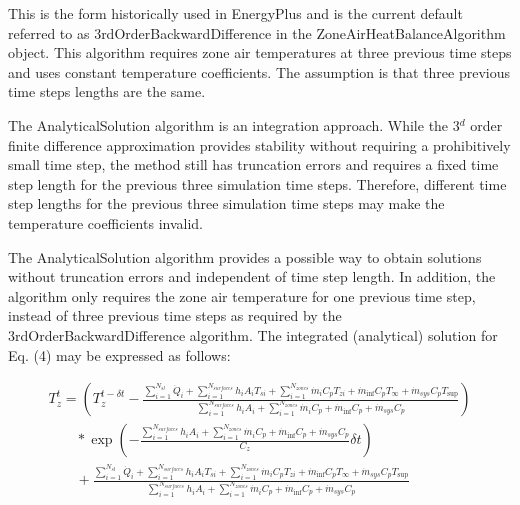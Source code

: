 This is the form historically used in EnergyPlus and is the current default referred to as 3rdOrderBackwardDifference in the ZoneAirHeatBalanceAlgorithm object. This algorithm requires zone air temperatures at three previous time steps and uses constant temperature coefficients. The assumption is that three previous time steps lengths are the same.

The AnalyticalSolution algorithm is an integration approach. While the 3\(^{d}\) order finite difference approximation provides stability without requiring a prohibitively small time step, the method still has truncation errors and requires a fixed time step length for the previous three simulation time steps. Therefore, different time step lengths for the previous three simulation time steps may make the temperature coefficients invalid.

The AnalyticalSolution algorithm provides a possible way to obtain solutions without truncation errors and independent of time step length. In addition, the algorithm only requires the zone air temperature for one previous time step, instead of three previous time steps as required by the 3rdOrderBackwardDifference algorithm. The integrated (analytical) solution for Eq. (4) may be expressed as follows:

\begin{equation}
\begin{array}{l}T_z^t = \left( {T_z^{t - \delta t} - \frac{{\sum\limits_{i = 1}^{{N_{sl}}} {{{\dot Q}_i}}  + \sum\limits_{i = 1}^{{N_{surfaces}}} {{h_i}} {A_i}{T_{si}} + \sum\limits_{i = 1}^{{N_{zones}}} {{{\dot m}_i}} {C_p}{T_{zi}} + {{\dot m}_{\inf }}{C_p}{T_\infty } + {{\dot m}_{sys}}{C_p}{T_{\sup }}}}{{\sum\limits_{i = 1}^{{N_{surfaces}}} {{h_i}} {A_i} + \sum\limits_{i = 1}^{{N_{zones}}} {{{\dot m}_i}} {C_p} + {{\dot m}_{\inf }}{C_p} + {{\dot m}_{sys}}{C_p}}}} \right)\\\;\;\;\;\;\;\;*\exp \left( { - \frac{{\sum\limits_{i = 1}^{{N_{surfaces}}} {{h_i}} {A_i} + \sum\limits_{i = 1}^{{N_{zones}}} {{{\dot m}_i}} {C_p} + {{\dot m}_{\inf }}{C_p} + {{\dot m}_{sys}}{C_p}}}{{{C_z}}}\delta t} \right)\\\;\;\;\;\;\;\; + \frac{{\sum\limits_{i = 1}^{{N_{sl}}} {{{\dot Q}_i}}  + \sum\limits_{i = 1}^{{N_{surfaces}}} {{h_i}} {A_i}{T_{si}} + \sum\limits_{i = 1}^{{N_{zones}}} {{{\dot m}_i}} {C_p}{T_{zi}} + {{\dot m}_{\inf }}{C_p}{T_\infty } + {{\dot m}_{sys}}{C_p}{T_{\sup }}}}{{\sum\limits_{i = 1}^{{N_{surfaces}}} {{h_i}} {A_i} + \sum\limits_{i = 1}^{{N_{zones}}} {{{\dot m}_i}} {C_p} + {{\dot m}_{\inf }}{C_p} + {{\dot m}_{sys}}{C_p}}}\end{array}
\end{equation}

